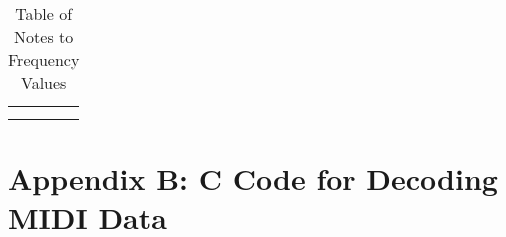 \documentclass[10pt]{article}
\begin{document}

\begin{table}[h]
    \centering
    \begin{tabular}{c|c}
         &  \\
         & 
    \end{tabular}
    \caption{Table of Notes to Frequency Values}
    \label{tab:pianonotestofrequency}
\end{table}

\section{Appendix B: C Code for Decoding MIDI Data}\label{sec:appendix-b:-c-code-for-decoding-midi-data}

\end{document}
